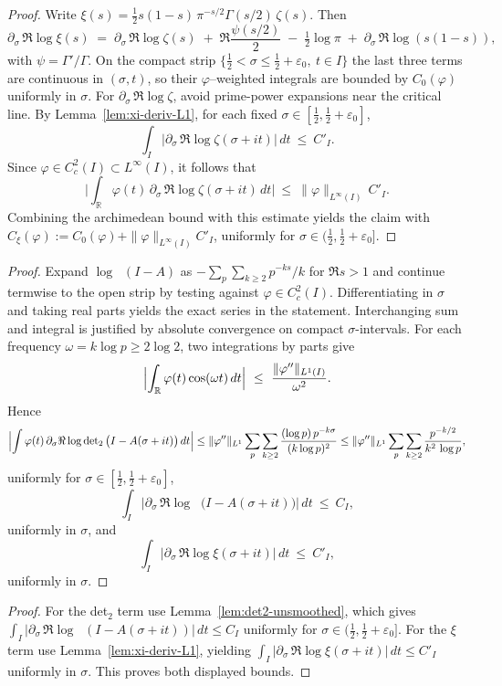 \documentclass[11pt]{article}
\theoremstyle{definition}
\theoremstyle{remark}
\newcommand{\R}{\mathbb{R}}
\DeclareMathOperator{\dettwo}{det_2}
\begin{document}
\begin{proof}
Write \(\xi(s)=\tfrac12 s(1-s)\,\pi^{-s/2}\Gamma(s/2)\,\zeta(s)\). Then
\[
 \partial_\sigma\,\Re\log\xi(s)\;=\;\partial_\sigma\,\Re\log\zeta(s)\; +\; \Re\frac{\psi(s/2)}{2}\; -\; \tfrac12\log\pi\; +\; \partial_\sigma\,\Re\log(s(1-s)),
\]
with \(\psi=\Gamma'/\Gamma\). On the compact strip \(\{\tfrac12<\sigma\le\tfrac12+\varepsilon_0,\ t\in I\}\) the last three terms are continuous in \((\sigma,t)\), so their \(\varphi\)–weighted integrals are bounded by \(C_0(\varphi)\) uniformly in \(\sigma\).
For \(\partial_\sigma\,\Re\log\zeta\), avoid prime-power expansions near the critical line. By Lemma~\ref{lem:xi-deriv-L1}, for each fixed \(\sigma\in[\tfrac12,\tfrac12+\varepsilon_0]\),
\[
 \int_I \Big|\partial_\sigma\,\Re\log\zeta(\sigma+it)\Big|\,dt\ \le\ C'_I.
\]
Since \(\varphi\in C_c^2(I)\subset L^\infty(I)\), it follows that
\[
 \Big|\int_{\R}\varphi(t)\,\partial_\sigma\,\Re\log\zeta(\sigma+it)\,dt\Big|\ \le\ \|\varphi\|_{L^\infty(I)}\,C'_I.
\]
Combining the archimedean bound with this estimate yields the claim with \(C_\xi(\varphi):=C_0(\varphi)+\|\varphi\|_{L^\infty(I)}C'_I\), uniformly for \(\sigma\in(\tfrac12,\tfrac12+\varepsilon_0]\).
\end{proof}
\begin{proof}
Expand \(\log\dettwo(I-A)\) as \(-\sum_{p}\sum_{k\ge2}p^{-ks}/k\) for \(\Re s>1\) and continue termwise to the open strip by testing against \(\varphi\in C_c^2(I)\). Differentiating in \(\sigma\) and taking real parts yields the exact series in the statement. Interchanging sum and integral is justified by absolute convergence on compact \(\sigma\)-intervals.
For each frequency \(\omega=k\log p\ge 2\log 2\), two integrations by parts give
\[
\Bigl|\int_{\R}\varphi(t)\cos(\omega t)\,dt\Bigr|\ \le\ \frac{\|\varphi''\|_{L^1(I)}}{\omega^2}.
\]
Hence
\[
\Bigl|\int \varphi(t)\,\partial_\sigma\Re\log\dettwo\big(I-A(\sigma+it)\big)\,dt\Big|
\le \|\varphi''\|_{L^1}\sum_{p}\sum_{k\ge 2}\frac{(\log p)\,p^{-k\sigma}}{(k\log p)^2}
\le \|\varphi''\|_{L^1}\sum_{p}\sum_{k\ge 2}\frac{p^{-k/2}}{k^2\,\log p},
\]
uniformly for \(\sigma\in[\tfrac12,\tfrac12+\varepsilon_0]\),
\[
 \int_I \Big|\partial_\sigma\,\Re\log\dettwo\big(I-A(\sigma+it)\big)\Big|\,dt\ \le\ C_I,
\]
uniformly in \(\sigma\), and
\[
 \int_I \Big|\partial_\sigma\,\Re\log\xi(\sigma+it)\Big|\,dt\ \le\ C'_I,
\]
uniformly in \(\sigma\).
\end{proof}
\begin{proof}
For the det$_2$ term use Lemma~\ref{lem:det2-unsmoothed}, which gives
\(\int_I |\partial_\sigma\,\Re\log\dettwo(I-A(\sigma+it))|\,dt\le C_I\) uniformly for \(\sigma\in(\tfrac12,\tfrac12+\varepsilon_0]\).
For the \(\xi\) term use Lemma~\ref{lem:xi-deriv-L1}, yielding \(\int_I |\partial_\sigma\,\Re\log\xi(\sigma+it)|\,dt\le C'_I\) uniformly in \(\sigma\). This proves both displayed bounds.
\end{proof}
\end{document}
